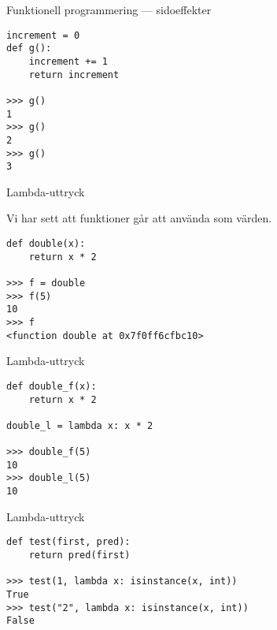 \documentclass{beamer}
\begin{document}
  \begin{frame}[fragile]{Funktionell programmering --- sidoeffekter}

    \begin{lstlisting}
increment = 0
def g():
    increment += 1
    return increment

>>> g()
1
>>> g()
2
>>> g()
3
    \end{lstlisting}

  \end{frame}

  \begin{frame}[fragile]{Lambda-uttryck}

    Vi har sett att funktioner går att använda som värden.

    \begin{lstlisting}
def double(x):
    return x * 2

>>> f = double
>>> f(5)
10
>>> f
<function double at 0x7f0ff6cfbc10>
    \end{lstlisting}

  \end{frame}

  \begin{frame}[fragile]{Lambda-uttryck}

    \begin{lstlisting}
def double_f(x):
    return x * 2

double_l = lambda x: x * 2

>>> double_f(5)
10
>>> double_l(5)
10
    \end{lstlisting}

  \end{frame}

  \begin{frame}[fragile]{Lambda-uttryck}

    \begin{lstlisting}
def test(first, pred):
    return pred(first)

>>> test(1, lambda x: isinstance(x, int))
True
>>> test("2", lambda x: isinstance(x, int))
False
    \end{lstlisting}

  \end{frame}
\end{document}
